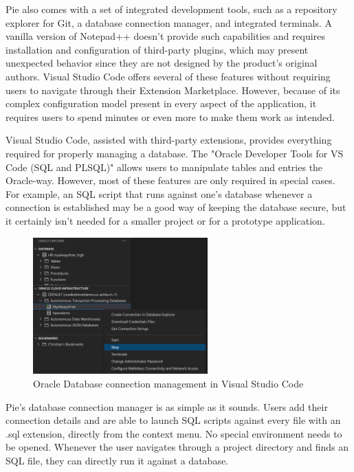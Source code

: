 Pie also comes with a set of integrated development tools, such as a repository explorer for Git, a database connection manager, and integrated terminals. A vanilla version of Notepad++ doesn't provide such capabilities and requires installation and configuration of third-party plugins, which may present unexpected behavior since they are not designed by the product's original authors. Visual Studio Code offers several of these features without requiring users to navigate through their Extension Marketplace. However, because of its complex configuration model present in every aspect of the application, it requires users to spend minutes or even more to make them work as intended.

Visual Studio Code, assisted with third-party extensions, provides everything required for properly managing a database. The "Oracle Developer Tools for VS Code (SQL and PLSQL)" allows users to manipulate tables and entries the Oracle-way. However, most of these features are only required in special cases. For example, an SQL script that runs against one's database whenever a connection is established may be a good way of keeping the database secure, but it certainly isn't needed for a smaller project or for a prototype application.

\begin{figure}[h]
\centering
\includegraphics[width=0.6\textwidth]{images/oracledb-vscode.png}
\caption{Oracle Database connection management in Visual Studio Code}
\label{fig:fig2,1.}
\end{figure}

Pie's database connection manager is as simple as it sounds. Users add their connection details and are able to launch SQL scripts against every file with an .sql extension, directly from the context menu. No special environment needs to be opened. Whenever the user navigates through a project directory and finds an SQL file, they can directly run it against a database.

